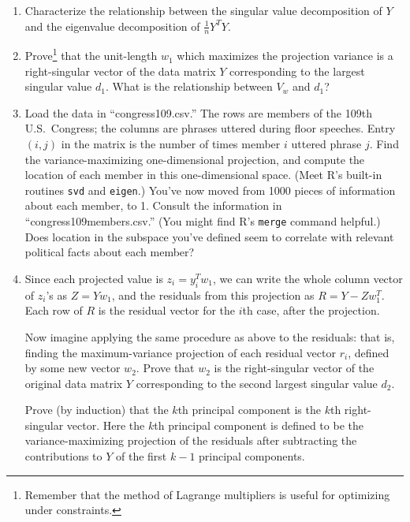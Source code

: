 \documentclass{mynotes}
\begin{document}
\begin{enumerate}

\item Characterize the relationship between the singular value decomposition of $Y$ and the eigenvalue decomposition of $\frac{1}{n} Y^T Y$.

\item Prove\footnote{Remember that the method of Lagrange multipliers is useful for optimizing under constraints.} that the unit-length $w_1$ which maximizes the projection variance is a right-singular vector of the data matrix $Y$ corresponding to the largest singular value $d_1$.  What is the relationship between $V_w$ and $d_1$?

\item Load the data in ``congress109.csv.''  The rows are members of the 109th U.S.~Congress; the columns are phrases uttered during floor speeches.  Entry $(i,j)$ in the matrix is the number of times member $i$ uttered phrase $j$.  Find the variance-maximizing one-dimensional projection, and compute the location of each member in this one-dimensional space.  (Meet R's built-in routines \verb|svd| and \verb|eigen|.) You've now moved from 1000 pieces of information about each member, to 1.  Consult the information in ``congress109members.csv.''  (You might find R's \verb|merge| command helpful.)  Does location in the  subspace you've defined seem to correlate with relevant political facts about each member?

\item Since each projected value is $z_i = y_i^T w_1$, we can write the whole column vector of $z_i$'s as $Z = Y w_1$, and the residuals from this projection as $R = Y - Z w_1^T$.  Each row of $R$ is the residual vector for the $i$th case, after the projection.

Now imagine applying the same procedure as above to the residuals: that is, finding the maximum-variance projection of each residual vector $r_i$, defined by some new vector $w_2$.  Prove that $w_2$ is the right-singular vector of the original data matrix $Y$ corresponding to the second largest singular value $d_2$.

Prove (by induction) that the $k$th principal component is the $k$th right-singular vector.  Here the $k$th principal component is defined to be the variance-maximizing projection of the residuals after subtracting the contributions to $Y$ of the first $k-1$ principal components.

\end{enumerate}
\end{document}
